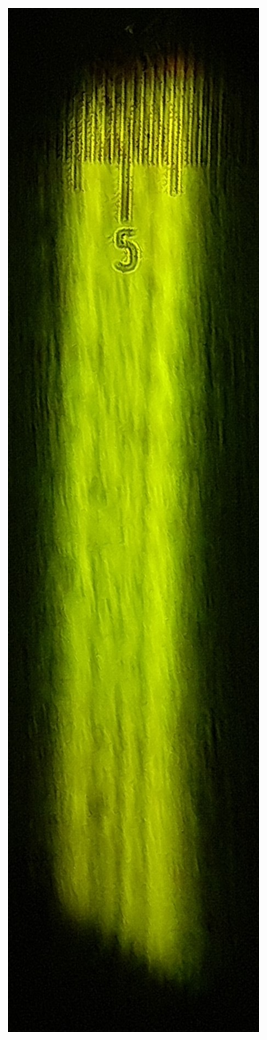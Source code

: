 \documentclass[14pt, a4paper]{report}
\begin{document}
\begin{enumerate}
\begin{figure}[H]
\begin{minipage}{.33\textwidth}
\end{minipage}%
\begin{minipage}{.33\textwidth}
  \centering
  \includegraphics[width=.6\linewidth]{../images/431m_3}

\end{minipage}
\end{figure}
\end{enumerate}
\end{document}
